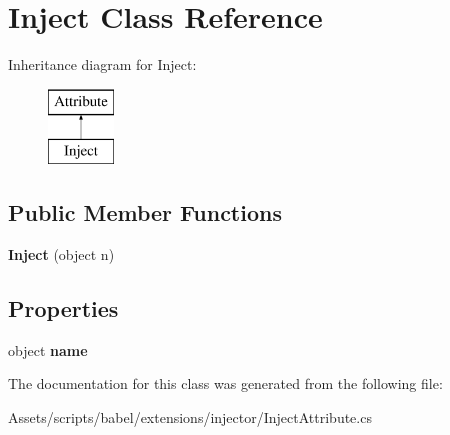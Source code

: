 \hypertarget{class_inject}{\section{Inject Class Reference}
\label{class_inject}
}
Inheritance diagram for Inject\-:\begin{figure}[H]
\begin{center}
\leavevmode
\includegraphics[height=2.000000cm]{class_inject}
\end{center}
\end{figure}
\subsection*{Public Member Functions}
\begin{DoxyCompactItemize}
\item 
\hypertarget{class_inject_ad157d14fd18b041da3a751ee41161aef}{{\bfseries Inject} (object n)}\label{class_inject_ad157d14fd18b041da3a751ee41161aef}

\end{DoxyCompactItemize}
\subsection*{Properties}
\begin{DoxyCompactItemize}
\item 
\hypertarget{class_inject_af269f593cee42918b948497e4dfb3a3d}{object {\bfseries name}}\label{class_inject_af269f593cee42918b948497e4dfb3a3d}

\end{DoxyCompactItemize}


The documentation for this class was generated from the following file\-:\begin{DoxyCompactItemize}
\item 
Assets/scripts/babel/extensions/injector/Inject\-Attribute.\-cs\end{DoxyCompactItemize}
